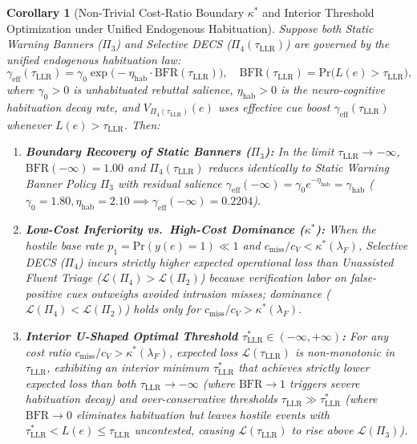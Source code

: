 \documentclass[11pt,a4paper]{article}
\newtheorem{corollary}{Corollary}
\begin{document}
\begin{corollary}[Non-Trivial Cost-Ratio Boundary $\kappa^*$ and Interior Threshold Optimization under Unified Endogenous Habituation]
\label{cor:dominance_boundary}
Suppose both Static Warning Banners ($\Pi_3$) and Selective DECS ($\Pi_4(\tau_{\text{LLR}})$) are governed by the unified endogenous habituation law:
\begin{equation}
\label{eq:unified_hab}
\gamma_{\text{eff}}(\tau_{\text{LLR}}) = \gamma_0 \exp\bigl(-\eta_{\text{hab}} \cdot \text{BFR}(\tau_{\text{LLR}})\bigr), \quad \text{BFR}(\tau_{\text{LLR}}) = \text{Pr}\bigl(L(e) > \tau_{\text{LLR}}\bigr),
\end{equation}
where $\gamma_0 > 0$ is unhabituated rebuttal salience, $\eta_{\text{hab}} > 0$ is the neuro-cognitive habituation decay rate, and $V_{\Pi_4(\tau_{\text{LLR}})}(e)$ uses effective cue boost $\gamma_{\text{eff}}(\tau_{\text{LLR}})$ whenever $L(e) > \tau_{\text{LLR}}$. Then:
\begin{enumerate}
  \item \textbf{Boundary Recovery of Static Banners ($\Pi_3$):} In the limit $\tau_{\text{LLR}} \to -\infty$, $\text{BFR}(-\infty) = 1.00$ and $\Pi_4(\tau_{\text{LLR}})$ reduces identically to Static Warning Banner Policy $\Pi_3$ with residual salience $\gamma_{\text{eff}}(-\infty) = \gamma_0 e^{-\eta_{\text{hab}}} = \gamma_{\text{hab}}$ ($\gamma_0 = 1.80, \eta_{\text{hab}} = 2.10 \implies \gamma_{\text{eff}}(-\infty) = 0.2204$).
  \item \textbf{Low-Cost Inferiority vs.\ High-Cost Dominance ($\kappa^*$):} When the hostile base rate $p_1 = \text{Pr}(y(e)=1) \ll 1$ and $c_{\text{miss}}/c_V < \kappa^*(\lambda_F)$, Selective DECS ($\Pi_4$) incurs strictly \emph{higher} expected operational loss than Unassisted Fluent Triage ($\mathcal{L}(\Pi_4) > \mathcal{L}(\Pi_2)$) because verification labor on false-positive cues outweighs avoided intrusion misses; dominance ($\mathcal{L}(\Pi_4) < \mathcal{L}(\Pi_2)$) holds only for $c_{\text{miss}}/c_V > \kappa^*(\lambda_F)$.
  \item \textbf{Interior U-Shaped Optimal Threshold $\tau^*_{\text{LLR}} \in (-\infty, +\infty)$:} For any cost ratio $c_{\text{miss}}/c_V > \kappa^*(\lambda_F)$, expected loss $\mathcal{L}(\tau_{\text{LLR}})$ is non-monotonic in $\tau_{\text{LLR}}$, exhibiting an interior minimum $\tau^*_{\text{LLR}}$ that achieves strictly lower expected loss than both $\tau_{\text{LLR}} \to -\infty$ (where $\text{BFR} \to 1$ triggers severe habituation decay) and over-conservative thresholds $\tau_{\text{LLR}} \gg \tau^*_{\text{LLR}}$ (where $\text{BFR} \to 0$ eliminates habituation but leaves hostile events with $\tau^*_{\text{LLR}} < L(e) \le \tau_{\text{LLR}}$ uncontested, causing $\mathcal{L}(\tau_{\text{LLR}})$ to rise above $\mathcal{L}(\Pi_3)$).
\end{enumerate}
\end{corollary}
\end{document}
